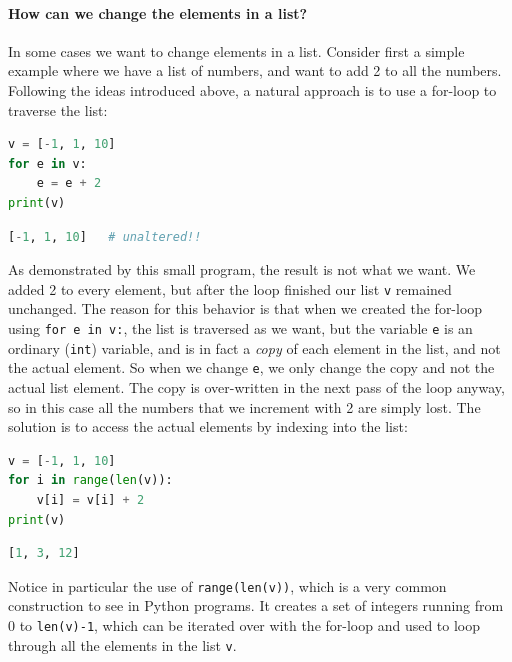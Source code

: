 \documentclass[graybox,envcountchap,sectrefs,final]{svmonodo}
\begin{document}
\paragraph{How can we change the elements in a list?}
In some cases we want to change elements in a list. Consider first a simple example where we have a list of numbers,
and want to add 2 to all the numbers. Following the ideas introduced above, a natural approach is to use a for-loop to traverse the list:
\begin{lstlisting}[language=Python,style=blue1]
v = [-1, 1, 10]
for e in v:
    e = e + 2
print(v)
\end{lstlisting}
\begin{lstlisting}[language=Python,style=blue1]
[-1, 1, 10]   # unaltered!!
\end{lstlisting}
As demonstrated by this small program, the result is not what we want. We added 2 to every element, but after the loop
finished our list \texttt{v} remained unchanged. The reason for this behavior is that when we created the for-loop using \texttt{for e in v:},
the list is traversed as we want, but the variable \texttt{e} is an ordinary (\texttt{int}) variable, and is in fact a \emph{copy} of
each element in the list, and not the actual element.
So when we change \texttt{e}, we only change the copy and not the actual list element. The copy is over-written in the next pass of the
loop anyway, so in this case all the numbers that we increment with 2 are simply lost. The solution is to access the actual elements
by indexing into the list:
\begin{lstlisting}[language=Python,style=blue1]
v = [-1, 1, 10]
for i in range(len(v)):
    v[i] = v[i] + 2
print(v)
\end{lstlisting}
\begin{lstlisting}[language=Python,style=blue1]
[1, 3, 12]
\end{lstlisting}
Notice in particular the use of \texttt{range(len(v))}, which is a very common construction to see in Python programs.
It creates a set of integers running from 0 to \texttt{len(v)-1}, which can be iterated over
with the for-loop and used to loop through all the elements in the list \texttt{v}.
\end{document}
